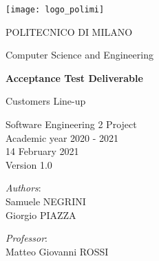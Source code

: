 \begin{titlingpage}
	\begin{center}
		\texttt{[image: logo\_polimi]}

		\vspace{0.25cm}

		\LARGE POLITECNICO DI MILANO\\

		\vspace{0.2cm}

		\Large Computer Science and Engineering

		\vspace{0.8cm}

		\Huge \textbf{Acceptance Test Deliverable}

		\vspace{0.5cm}
		\huge Customers Line-up

		\vspace{1.5cm}
		\LARGE Software Engineering 2 Project\\
		\Large Academic year 2020 - 2021\\
		\vspace{1cm}
		14 February 2021\\Version 1.0
		\vspace{3cm}

		\large
		\begin{minipage}{.1\textwidth}
			\null
		\end{minipage}%
		\begin{minipage}{.4\textwidth}
			\textit{Authors}:\\
			Samuele NEGRINI\\
			Giorgio PIAZZA
		\end{minipage}%
		\begin{minipage}{.4\textwidth}
			\raggedleft
			\textit{Professor}:\\
			Matteo Giovanni ROSSI\\
			\phantom{placeholder}
		\end{minipage}%
		\begin{minipage}{.1\textwidth}
			\null
		\end{minipage}


		\end{center}
\end{titlingpage}